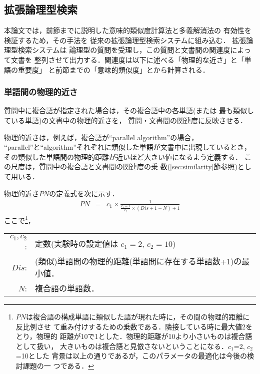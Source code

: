 \subsection{拡張論理型検索}\label{sec:process}
本論文では，前節までに説明した意味的類似度計算法と多義解消法の
有効性を検証するため，その手法を
従来の拡張論理型検索システムに組み込む．
拡張論理型検索システムは
論理型の質問を受理し，この質問と文書間の関連度によって文書を
整列させて出力する．関連度は以下に述べる「物理的な近さ」と「単語の重要度」
と前節までの「意味的類似度」とから計算される．

\subsubsection{単語間の物理的近さ}\label{sec:nearness}
質問中に複合語が指定された場合は，その複合語中の各単語(または
最も類似している単語)の文書中の物理的近さを，
質問・文書間の関連度に反映させる\cite{Oi95}．

物理的近さは，例えば，複合語が``parallel algorithm''の場合，
``parallel''と``algorithm''それぞれに類似した単語が文書中に出現しているとき，
その類似した単語間の物理的距離が近いほど大きい値になるよう定義する．
 この尺度は，質問中の複合語と文書間の関連度の乗
数(\ref{sec:similarity}節参照)として用いる．

  物理的近さ$PN$の定義式を次に示す．
\begin{eqnarray}
  PN & = & c_1\times \frac{\displaystyle 1}{\displaystyle
        \frac{\displaystyle c_1-1}{\displaystyle c_2}\times (Dis+1-N)+1}\label{eqn:nearness}
\end{eqnarray}
ここで\footnote{$PN$は複合語の構成単語に類似した語が現れた時に，その間の物理的距離に反比例させ
て重み付けするための乗数である．隣接している時に最大値2をとり，物理的
距離が10で1とした．物理的距離が10より小さいものは複合語として扱い，
大きいものは複合語と見倣さないということになる．$c_1$=2, $c_2$=10とした 
背景は以上の通りであるが，このパラメータの最適化は今後の検討課題の一
つである．}，
\begin{center}
\begin{tabular}[t]{rp{115mm}}
 $c_1, c_2$: & 定数(実験時の設定値は
$c_1=2$, $c_2=10$)\\
 $Dis$: & (類似)単語間の物理的距離(単語間に存在する単語数+1)の最小値．\\
 $N$: & 複合語の単語数．
\end{tabular}
\end{center}

